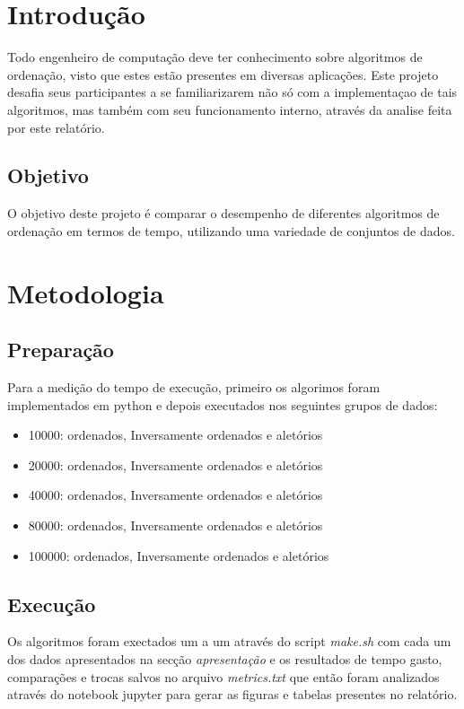 \chapter{Introdução}
 Todo engenheiro de computação deve ter conhecimento sobre algoritmos de ordenação, visto que estes estão presentes em diversas aplicações. Este projeto desafia seus participantes a se familiarizarem não só com a implementaçao de tais algoritmos, mas também com seu funcionamento interno, através da analise feita por este relatório.
\section{Objetivo}
  O objetivo deste projeto é comparar o desempenho de diferentes algoritmos de
ordenação em termos de tempo, utilizando uma variedade de
conjuntos de dados.


\chapter{Metodologia}
\section{Preparação}
Para a medição do tempo de execução, primeiro os algorimos foram implementados em python e depois executados nos seguintes grupos de dados:
\begin{itemize}
  \item 10000: ordenados, Inversamente ordenados e aletórios
  \item 20000: ordenados, Inversamente ordenados e aletórios
  \item 40000: ordenados, Inversamente ordenados e aletórios
  \item 80000: ordenados, Inversamente ordenados e aletórios
  \item 100000: ordenados, Inversamente ordenados e aletórios
\end{itemize}

\section{Execução}
Os algoritmos foram exectados um a um através do script \textit{make.sh} com cada um dos dados apresentados na secção \textit{apresentação} e os resultados de tempo gasto, comparações e trocas salvos no arquivo \textit{metrics.txt} que então foram analizados através do notebook jupyter para gerar as figuras e tabelas presentes no relatório.

